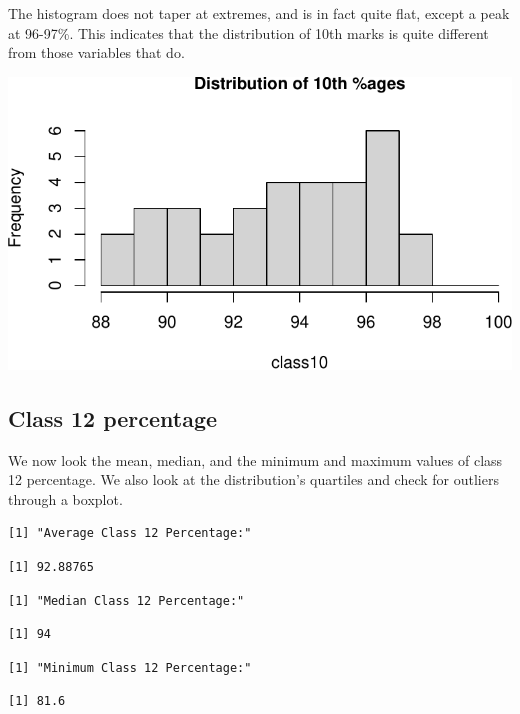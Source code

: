 \documentclass[
  letterpaper,
  DIV=11,
  numbers=noendperiod]{scrartcl}
\begin{document}
The histogram does not taper at extremes, and is in fact quite flat,
except a peak at 96-97\%. This indicates that the distribution of 10th
marks is quite different from those variables that do.

\includegraphics{Question1_files/figure-pdf/unnamed-chunk-3-1.pdf}

\hypertarget{class-12-percentage}{%
\subsection{Class 12 percentage}\label{class-12-percentage}}

We now look the mean, median, and the minimum and maximum values of
class 12 percentage. We also look at the distribution's quartiles and
check for outliers through a boxplot.

\begin{verbatim}
[1] "Average Class 12 Percentage:"
\end{verbatim}

\begin{verbatim}
[1] 92.88765
\end{verbatim}

\begin{verbatim}
[1] "Median Class 12 Percentage:"
\end{verbatim}

\begin{verbatim}
[1] 94
\end{verbatim}

\begin{verbatim}
[1] "Minimum Class 12 Percentage:"
\end{verbatim}

\begin{verbatim}
[1] 81.6
\end{verbatim}
\end{document}
